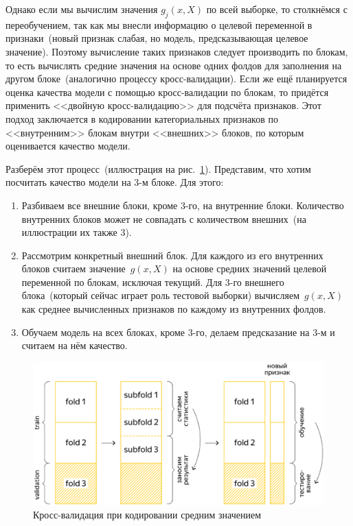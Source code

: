 \documentclass[12pt,fleqn]{article}
\begin{document}
Однако если мы вычислим значения $g_j(x, X)$ по всей выборке,
то столкнёмся с переобучением, так как мы внесли информацию о целевой переменной
в признаки~(новый признак слабая, но модель, предсказывающая целевое значение).
Поэтому вычисление таких признаков следует производить по блокам,
то есть вычислять средние значения на основе одних фолдов
для заполнения на другом блоке~(аналогично процессу кросс-валидации).
Если же ещё планируется оценка качества модели с помощью кросс-валидации по блокам,
то придётся применить <<двойную кросс-валидацию>> для подсчёта признаков.
Этот подход заключается в кодировании категориальных признаков по <<внутренним>> блокам внутри <<внешних>> блоков,
по которым оценивается качество модели.

Разберём этот процесс~(иллюстрация на рис.~\ref{fig:cv_meantarget}).
Представим, что хотим посчитать качество модели на 3-м блоке. Для этого:
\begin{enumerate}
    \item Разбиваем все внешние блоки, кроме 3-го, на внутренние блоки.
        Количество внутренних блоков может не совпадать с количеством внешних~(на иллюстрации их также 3).
    \item Рассмотрим конкретный внешний блок.
        Для каждого из его внутренних блоков считаем значение~$g(x, X)$ на основе средних значений целевой переменной по блокам,
        исключая текущий. Для 3-го внешнего блока~(который сейчас играет роль тестовой выборки)
        вычисляем~$g(x, X)$ как среднее вычисленных признаков по каждому из внутренних фолдов.
    \item Обучаем модель на всех блоках, кроме 3-го, делаем предсказание на 3-м и считаем на нём качество.
\end{enumerate}

\begin{center}
\begin{figure}[!htb]
 \centering
 \includegraphics[width=0.8\linewidth]{img/cv_meantarget.eps}
 \caption{Кросс-валидация при кодировании средним значением}\label{fig:cv_meantarget}
\end{figure}
\end{center}
\end{document}
